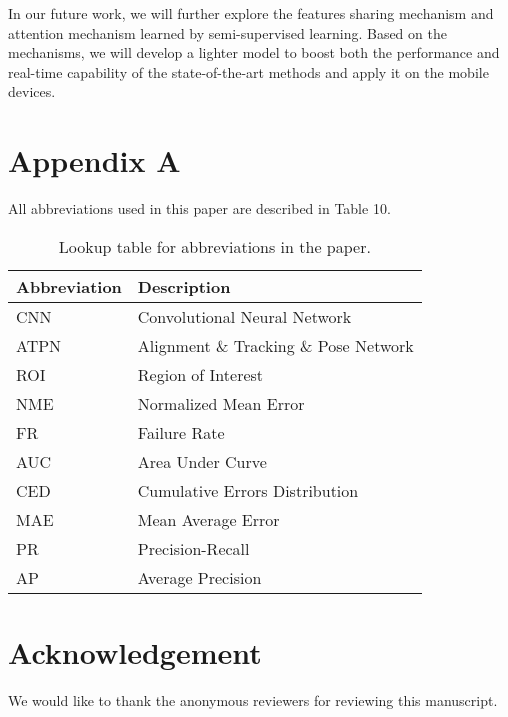 \documentclass[3p,twocolumn, round, sort & compress]{elsarticle}
\begin{document}
In our future work, we will further explore the features sharing mechanism and attention mechanism learned by semi-supervised learning. Based on the mechanisms, we will develop a lighter model to boost both the performance and real-time capability of the state-of-the-art methods and apply it on the mobile devices.  


\newpage

\section*{Appendix A}
All abbreviations used in this paper are described in Table 10.

\begin{table}[h]
	\centering
	\begin{tabular}{m{1.5cm}<{\centering}m{5.6cm}<{\centering}}
		\hline
		Abbreviation & Description                           \\ \hline
		CNN          & Convolutional Neural Network          \\
		ATPN         & Alignment \& Tracking \& Pose Network \\
		ROI          & Region of Interest                    \\
		NME          & Normalized Mean Error                 \\
		FR           & Failure Rate                          \\
		AUC          & Area Under Curve                      \\
		CED          & Cumulative Errors Distribution        \\
		MAE          & Mean Average Error                    \\
		PR           & Precision-Recall                      \\
		AP           & Average Precision                     \\ \hline
	\end{tabular}
	\caption{Lookup table for abbreviations in the paper.}
\end{table}

\section*{Acknowledgement}
We would like to thank the anonymous reviewers for reviewing this manuscript.




\end{document}
